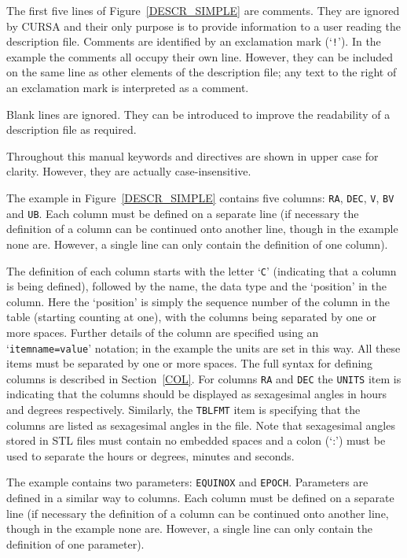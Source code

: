 \documentclass[twoside,11pt]{article}
\renewcommand{\_}{\texttt{\symbol{95}}}
\begin{document}
The first five lines of Figure~\ref{DESCR_SIMPLE} are
comments.  They are ignored by CURSA and their only purpose is to
provide information to a user reading the description file.  Comments
are identified by an exclamation mark (`{\tt !}').  In the example the
comments all occupy their own line.  However, they can be included on
the same line as other elements of the description file; any text to
the right of an exclamation mark is interpreted as a comment.

Blank lines are ignored.  They can be introduced to improve the
readability of a description file as required.

Throughout this manual keywords and directives are shown in upper
case for clarity.  However, they are actually case-insensitive.

The example in Figure~\ref{DESCR_SIMPLE} contains five columns:
{\tt RA}, {\tt DEC}, {\tt V}, {\tt B\_V} and {\tt U\_B}.  Each column
must be defined on a separate line (if necessary the definition of a
column can be continued onto another line, though in the example none
are.  However, a single line can only contain the definition of one
column).

The definition of each column starts with the letter `{\tt C}'
(indicating that a column is being defined), followed by the name, the
data type and the `position' in the column.  Here the `position' is
simply the sequence number of the column in the table (starting counting
at one), with the columns being separated by one or more spaces.  Further
details of the column are specified using an `{\tt item\_name=value}'
notation; in the example the units are set in this way.  All these items
must be separated by one or more spaces.  The full syntax for defining
columns is described in Section~\ref{COL}.  For columns {\tt RA} and
{\tt DEC} the {\tt UNITS} item is indicating that the columns should be
displayed as sexagesimal angles in hours and degrees respectively.
Similarly, the {\tt TBLFMT} item is specifying that the columns are
listed as sexagesimal angles in the file.  Note that sexagesimal angles
stored in STL files must contain no embedded spaces and a colon (`:')
must be used to separate the hours or degrees, minutes and seconds.

The example contains two parameters: {\tt EQUINOX} and {\tt EPOCH}.
Parameters are defined in a similar way to columns.  Each column
must be defined on a separate line (if necessary the definition of a
column can be continued onto another line, though in the example none
are.  However, a single line can only contain the definition of one
parameter).
\end{document}
